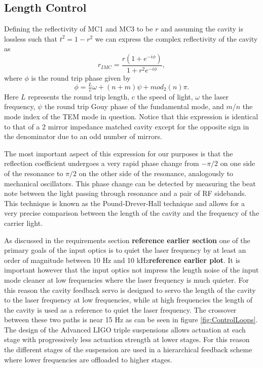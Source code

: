 \documentclass[10pt]{article}
\begin{document}
\subsection{Length Control}
Defining the reflectivity of MC1 and MC3 to be $r$ and assuming the cavity is lossless such that 
$t^2 = 1-r^2$ we can express the complex reflectivity of the cavity as 
\begin{equation}
	r_{IMC} = \frac{r(1+e^{-i\phi})}{1+r^2e^{-i\phi}},
\end{equation}
where $\phi$ is the round trip phase given by 
\begin{equation}
	\phi=\tfrac{L}{c}\omega+(n+m)\psi+mod_2(n)\pi.
	\label{eq:phi}
\end{equation}	
Here $L$ represents the round trip length, $c$ the speed of light, $\omega$ the laser frequency, 
$\psi$ the round trip Gouy phase of the fundamental mode, and $m$/$n$ the mode index of the 
TEM mode in question.  
Notice that this expression is identical to that of a 2 mirror impedance matched cavity except 
for the opposite sign in the denominator due to an odd number of mirrors.  

The most important aspect of this expression for our purposes is that the reflection coefficient 
undergoes a very rapid phase change from $-\pi/2$ on one side of the resonance to $\pi/2$ 
on the other side of the resonance, analogously to mechanical oscillators.  
This phase change can be detected by measuring the beat note between the light passing 
through resonance and a pair of RF sidebands.  
This technique is known as the Pound-Drever-Hall technique\cite{EricBlack}\cite{DreverHall} 
and allows for a very precise comparison between the length of the cavity and the frequency 
of the carrier light.  

As discussed in the requirements section \textbf{reference earlier section} one of the primary 
goals of the input optics is to quiet the laser frequency by at least an order of magnitude 
between 10 Hz and 10 kHz\textbf{reference earlier plot}.  
It is important however that the input optics not impress the length noise of the input mode 
cleaner at low frequencies where the laser frequency is much quieter.  
For this reason the cavity feedback servo is designed to servo the length of the 
cavity to the laser frequency at low frequencies, while at high frequencies the 
length of the cavity is used as a reference to quiet the laser frequency.  
The crossover between these two paths is near 15 Hz as can be seen in figure 
\ref{fig:ControlLoops}.  
The design of the Advanced LIGO triple suspensions allows actuation at each stage 
with progressively less actuation strength at lower stages.  
For this reason the different stages of the suspension are used in a hierarchical 
feedback scheme where lower frequencies are offloaded to higher stages.  
\end{document}
